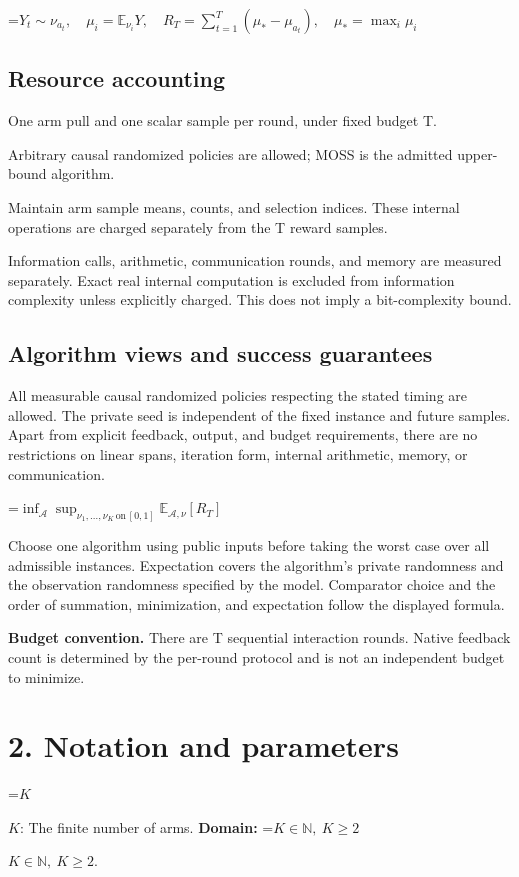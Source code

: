 \documentclass[10pt,a4paper]{article}
\newcommand{\AtlasMath}[1]{\par\begingroup\centering\setbox0=\hbox{$\displaystyle #1$}\ifdim\wd0>1.4\linewidth\typeout{ATLAS WIDE FORMULA: \the\wd0}\fi\ifdim\wd0>\linewidth\resizebox{\linewidth}{!}{\box0}\else\box0\fi\par\endgroup}
\newcommand{\AtlasInlineMath}[1]{\begingroup\setbox0=\hbox{$#1$}\ifdim\wd0>.4\linewidth\endgroup\AtlasMath{#1}\else\endgroup$#1$\fi}
\begin{document}
\AtlasMath{Y_t\sim\nu_{a_t},\quad \mu_i=\mathbb{E}_{\nu_i}Y,\quad R_T=\sum_{t=1}^T(\mu_* -\mu_{a_t}),\quad \mu_* =\max_i\mu_i}


\subsection{Resource accounting}
One arm pull and one scalar sample per round, under fixed budget T.

Arbitrary causal randomized policies are allowed; MOSS is the admitted upper-bound algorithm.

Maintain arm sample means, counts, and selection indices. These internal operations are charged separately from the T reward samples.

Information calls, arithmetic, communication rounds, and memory are measured separately. Exact real internal computation is excluded from information complexity unless explicitly charged. This does not imply a bit-complexity bound.

\subsection{Algorithm views and success guarantees}
All measurable causal randomized policies respecting the stated timing are allowed. The private seed is independent of the fixed instance and future samples. Apart from explicit feedback, output, and budget requirements, there are no restrictions on linear spans, iteration form, internal arithmetic, memory, or communication.


\AtlasMath{\inf_{\mathcal{A}}\sup_{\nu_1,\ldots,\nu_K\,\mathrm{on}\,[0,1]}\mathbb{E}_{\mathcal{A},\nu}[R_T]}


Choose one algorithm using public inputs before taking the worst case over all admissible instances. Expectation covers the algorithm's private randomness and the observation randomness specified by the model. Comparator choice and the order of summation, minimization, and expectation follow the displayed formula.

\textbf{Budget convention.} There are T sequential interaction rounds. Native feedback count is determined by the per-round protocol and is not an independent budget to minimize.

\section{2. Notation and parameters}
\AtlasInlineMath{K}: The finite number of arms. \textbf{Domain:} \AtlasInlineMath{K\in\mathbb N,\ K\ge2}.
\end{document}
